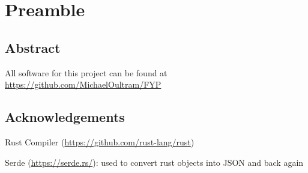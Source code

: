 \section{Preamble}
\subsection{Abstract}

All software for this project can be found at \url{https://github.com/MichaelOultram/FYP}

\subsection{Acknowledgements}
Rust Compiler (\url{https://github.com/rust-lang/rust})

Serde (\url{https://serde.rs/}): used to convert rust objects into JSON and back again
